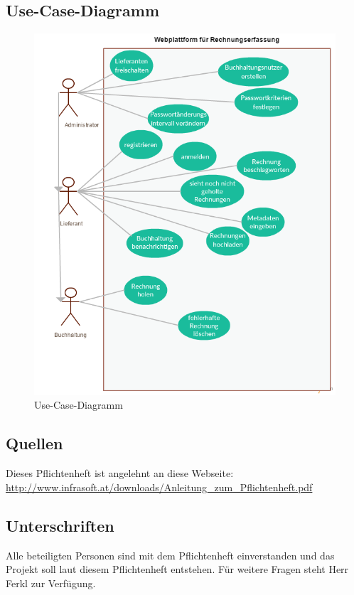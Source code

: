 \subsection{Use-Case-Diagramm}
\begin{figure}[h]
\centering
\includegraphics[width=13cm]{figures/Use-Case-Diagramm}
\caption{Use-Case-Diagramm}
\end{figure}

\newpage
\subsection{Quellen}

Dieses Pflichtenheft ist angelehnt an diese Webseite: \\
 \url{http://www.infrasoft.at/downloads/Anleitung_zum_Pflichtenheft.pdf}


\subsection{Unterschriften}

Alle beteiligten Personen sind mit dem Pflichtenheft einverstanden
und das Projekt soll laut diesem Pflichtenheft entstehen. Für weitere
Fragen steht Herr Ferkl zur Verfügung.

